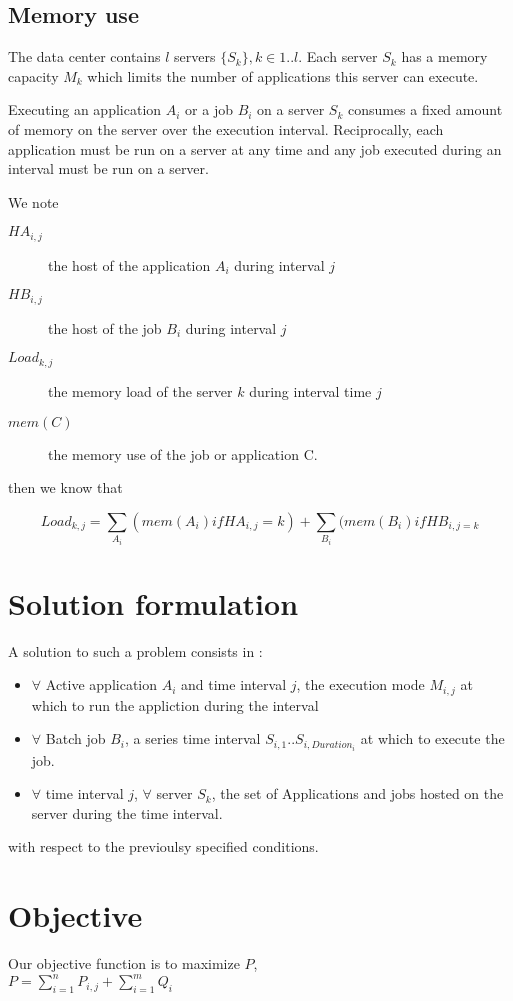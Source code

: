 \documentclass[a4paper]{article}
\begin{document}
\subsection{Memory use}

The data center contains $l$ servers $\{S_k\}, k\in 1..l$. Each server $S_k$ has a memory capacity $M_k$ which limits the number of applications this server can execute.

Executing an application $A_i$ or a job $B_i$ on a server $S_k$ consumes a fixed amount of memory 
on the server over the execution interval. Reciprocally, each application must be run on a server at any time and any job executed during an interval must be run on a server.

We note
\begin{description}
\item[$HA_{i,j}$] the host of the application $A_i$ during interval $j$
\item[$HB_{i,j}$] the host of the job $B_i$ during interval $j$
\item[$Load_{k,j}$] the memory load of the server $k$ during interval time $j$
\item[$mem(C)$] the memory use of the job or application C.
\end{description}

then we know that

\begin{equation}
Load_{k,j} = \sum_{A_i}(mem(A_i) if HA_{i,j}=k) + \sum_{B_i}(mem(B_i) if HB_{i,j=k}
\end{equation}

\section{Solution formulation}

A solution to such a problem consists in :
\begin{itemize}
\item $\forall$ Active application $A_i$ and time interval $j$, the execution mode $M_{i,j}$ at which to run the appliction during the interval
\item $\forall$ Batch job $B_i$, a series time interval $S_{i,1}..S_{i, Duration_i}$ at which to execute the job.
\item $\forall$ time interval $j$, $\forall$ server $S_k $, the set of Applications and jobs hosted on the server during the time interval.
\end{itemize}
with respect to the previoulsy specified conditions.

\section{Objective}
Our objective function is to maximize $P$,\\
$P=\sum_{i=1}^{n} {P_{i,j}} + \sum_{i=1}^{m} {Q_i}$
\end{document}

